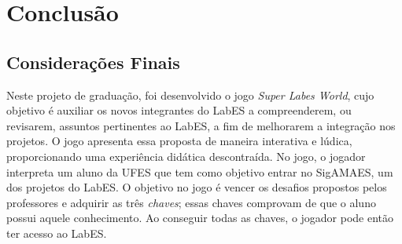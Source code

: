 \chapter{Conclusão}
\label{sec-conclusoes}




\section{Considerações Finais}
\label{sec-conclusoes-consideracoes}


Neste projeto de graduação, foi desenvolvido o jogo \textit{Super Labes World}, cujo objetivo é auxiliar os novos integrantes do LabES a compreenderem, ou revisarem, assuntos pertinentes ao LabES, a fim de melhorarem a integração nos projetos. O jogo apresenta essa proposta de maneira interativa e lúdica, proporcionando uma experiência didática descontraída. No jogo, o jogador interpreta um aluno da UFES que tem como objetivo entrar no SigAMAES, um dos projetos do LabES. O objetivo no jogo é vencer os desafios propostos pelos professores e adquirir as três \textit{chaves}; essas chaves comprovam de que o aluno possui aquele conhecimento. Ao conseguir todas as chaves, o jogador pode então ter acesso ao LabES.


